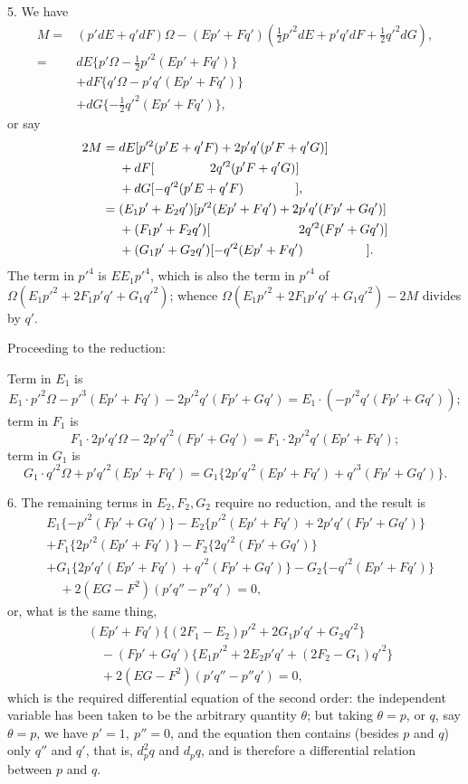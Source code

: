 \documentclass[11pt,a4paper]{article}
\begin{document}
5. We have
\[
\begin{aligned}
M={}&(p'dE+q'dF)\Omega
 -(Ep'+Fq')(\tfrac12p'^2dE+p'q'dF+\tfrac12q'^2dG),\\
={}&dE\{p'\Omega-\tfrac12p'^2(Ep'+Fq')\}\\
&+dF\{q'\Omega-p'q'(Ep'+Fq')\}\\
&+dG\{-\tfrac12q'^2(Ep'+Fq')\},
\end{aligned}
\]
or say
\[
\begin{aligned}
2M={}&dE[p'^2(p'E+q'F)+2p'q'(p'F+q'G)]\\
&+dF[\hspace{4.4em}2q'^2(p'F+q'G)]\\
&+dG[-q'^2(p'E+q'F)\hspace{4.1em}],\\
={}&(E_1p'+E_2q')[p'^2(Ep'+Fq')+2p'q'(Fp'+Gq')]\\
&+(F_1p'+F_2q')[\hspace{7em}2q'^2(Fp'+Gq')]\\
&+(G_1p'+G_2q')[-q'^2(Ep'+Fq')\hspace{5em}].
\end{aligned}
\]
The term in \(p'^4\) is \(EE_1p'^4\), which is also the term in \(p'^4\) of
\(\Omega(E_1p'^2+2F_1p'q'+G_1q'^2)\); whence
\(\Omega(E_1p'^2+2F_1p'q'+G_1q'^2)-2M\) divides by \(q'\).

Proceeding to the reduction:

Term in \(E_1\) is
\[
E_1\cdot p'^2\Omega-p'^3(Ep'+Fq')-2p'^2q'(Fp'+Gq')
=E_1\cdot(-p'^2q'(Fp'+Gq'));
\]
term in \(F_1\) is
\[
F_1\cdot 2p'q'\Omega-2p'q'^2(Fp'+Gq')
=F_1\cdot 2p'^2q'(Ep'+Fq');
\]
term in \(G_1\) is
\[
G_1\cdot q'^2\Omega+p'q'^2(Ep'+Fq')
=G_1\{2p'q'^2(Ep'+Fq')+q'^3(Fp'+Gq')\}.
\]

6. The remaining terms in \(E_2,F_2,G_2\) require no reduction, and the result is
\[
\begin{aligned}
&E_1\{-p'^2(Fp'+Gq')\}
-E_2\{p'^2(Ep'+Fq')+2p'q'(Fp'+Gq')\}\\
&+F_1\{2p'^2(Ep'+Fq')\}
-F_2\{2q'^2(Fp'+Gq')\}\\
&+G_1\{2p'q'(Ep'+Fq')+q'^2(Fp'+Gq')\}
-G_2\{-q'^2(Ep'+Fq')\}\\
&\quad+2(EG-F^2)(p'q''-p''q')=0,
\end{aligned}
\]
or, what is the same thing,
\[
\begin{aligned}
&(Ep'+Fq')\{(2F_1-E_2)p'^2+2G_1p'q'+G_2q'^2\}\\
&\quad-(Fp'+Gq')\{E_1p'^2+2E_2p'q'+(2F_2-G_1)q'^2\}\\
&\quad+2(EG-F^2)(p'q''-p''q')=0,
\end{aligned}
\]
which is the required differential equation of the second order: the independent
variable has been taken to be the arbitrary quantity \(\theta\); but taking
\(\theta=p\), or \(q\), say \(\theta=p\), we have \(p'=1,\ p''=0\), and the equation
then contains (besides \(p\) and \(q\)) only \(q''\) and \(q'\), that is, \(d_p^2q\)
and \(d_pq\), and is therefore a differential relation between \(p\) and \(q\).
\end{document}
